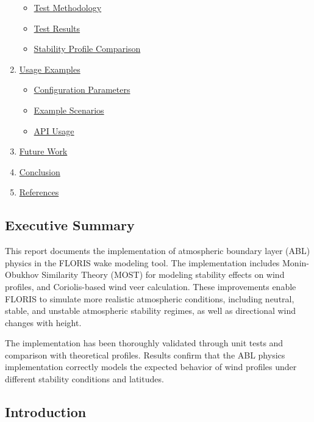 \documentclass[
]{article}
\providecommand{\tightlist}{%
  \setlength{\itemsep}{0pt}\setlength{\parskip}{0pt}}
\begin{document}
\begin{enumerate}
  \begin{itemize}
  \tightlist
  \item
    \protect\hyperlink{test-methodology}{Test Methodology}
  \item
    \protect\hyperlink{test-results}{Test Results}
  \item
    \protect\hyperlink{stability-profile-comparison}{Stability Profile
    Comparison}
  \end{itemize}
\item
  \protect\hyperlink{usage-examples}{Usage Examples}

  \begin{itemize}
  \tightlist
  \item
    \protect\hyperlink{configuration-parameters}{Configuration
    Parameters}
  \item
    \protect\hyperlink{example-scenarios}{Example Scenarios}
  \item
    \protect\hyperlink{api-usage}{API Usage}
  \end{itemize}
\item
  \protect\hyperlink{future-work}{Future Work}
\item
  \protect\hyperlink{conclusion}{Conclusion}
\item
  \protect\hyperlink{references}{References}
\end{enumerate}

\hypertarget{executive-summary}{%
\subsection{Executive Summary}\label{executive-summary}}

This report documents the implementation of atmospheric boundary layer
(ABL) physics in the FLORIS wake modeling tool. The implementation
includes Monin-Obukhov Similarity Theory (MOST) for modeling stability
effects on wind profiles, and Coriolis-based wind veer calculation.
These improvements enable FLORIS to simulate more realistic atmospheric
conditions, including neutral, stable, and unstable atmospheric
stability regimes, as well as directional wind changes with height.

The implementation has been thoroughly validated through unit tests and
comparison with theoretical profiles. Results confirm that the ABL
physics implementation correctly models the expected behavior of wind
profiles under different stability conditions and latitudes.

\hypertarget{introduction}{%
\subsection{Introduction}\label{introduction}}
\end{document}
